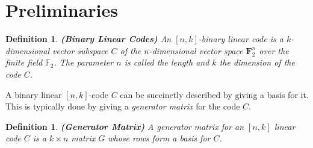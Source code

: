 \documentclass{sig-alternate-2013}
\newtheorem{definition}[theorem]{Definition}
\begin{document}

\section{Preliminaries}

\begin{definition}
  \textbf{(Binary Linear Codes)} An $[n,k]$-\emph{binary linear code}
  is a $k$-dimensional vector subspace $C$ of the $n$-dimensional
  vector space $\mathbf{F}_{2}^{n}$ over the finite field
  $\mathbb{F}_2$. The parameter $n$ is called the \emph{length} and
  $k$ the \emph{dimension} of the code $C$.
\end{definition}

A binary linear $[n, k]$-code $C$ can be succinctly described by
giving a basis for it. This is typically done by giving a
\emph{generator matrix} for the code $C$.

\begin{definition}\textbf{(Generator Matrix)}
  A generator matrix for an $[n,k]$ linear code $C$ is a $k \times n$
  matrix $G$ whose rows form a basis for $C$.
\end{definition}
\end{document}
